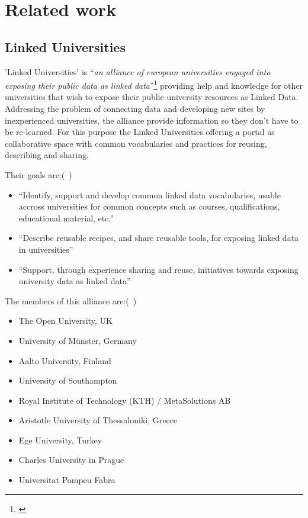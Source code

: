 \documentclass{article}
\begin{document}

\section{Related work}
\label{related-work}

\subsection{Linked Universities}
\label{related-work:linked-universities}
'Linked Universities' is "`\textit{an alliance of european universities engaged into exposing their public data as linked data}"'\footnote{\cite{url:linkeduniversities}} providing help and knowledge for other universities that wish to expose their public university resources as Linked Data. Addressing the problem of connecting data and developing new sites by inexperienced universities, the alliance provide information so they don't have to be re-learned. For this purpose the Linked Universities offering a portal as collaborative space with common vocabularies and practices for reusing, describing and sharing.

Their goals are:(~\cite{url:linkeduniversities})

\begin{itemize}
\item "`Identify, support and develop common linked data vocabularies, usable accross universities for common concepts such as courses, qualifications, educational material, etc."'
\item "`Describe reusable recipes, and share reusable tools, for exposing linked data in universities"'
\item "`Support, through experience sharing and reuse, initiatives towards exposing university data as linked data"'
\end{itemize}

The members of this alliance are:(~\cite{url:linked-universities-members})
\begin{itemize}
	\item The Open University, UK
	\item University of Münster, Germany
	\item Aalto University, Finland
	\item University of Southampton
	\item Royal Institute of Technology (KTH) / MetaSolutions AB
	\item Aristotle University of Thessaloniki, Greece
	\item Ege University, Turkey
	\item Charles University in Prague
	\item Universitat Pompeu Fabra
\end{itemize}
\end{document}
